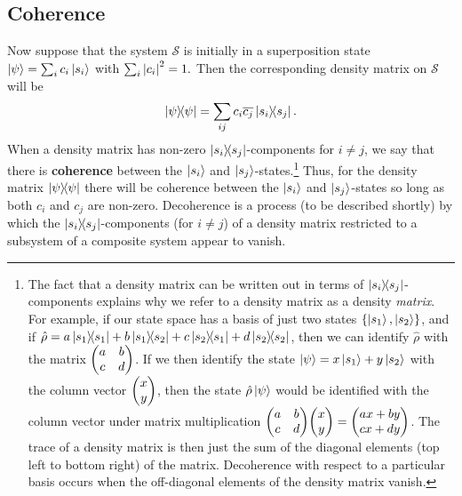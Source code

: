     \subsection{Coherence}
    Now suppose that the system $\mathcal{S}$ is initially in a superposition state $\ket{\psi}=\sum_i c_i\ket{s_i}$ with $\sum_i\abs{c_i}^2=1.$ Then the corresponding density matrix on $\mathcal{S}$ will be $$\dyad{\psi}=\sum_{ij} c_i\overline{c_j}\dyad{s_i}{s_j}.$$ When a density matrix has non-zero $\dyad{s_i}{s_j}$-components for $i\neq j$, we say that there is \textbf{coherence} between the  $\ket{s_i}$ and $\ket{s_j}$-states.\footnote{The fact that a density matrix can be written out in terms of $\dyad{s_i}{s_j}$-components explains why we refer to a density matrix as a density \emph{matrix}. For example, if our state space has a basis of just two states $\{\ket{s_1},\ket{s_2}\}$, and if $\hat{\rho}=a\dyad{s_1}+b\dyad{s_1}{s_2}+c\dyad{s_2}{s_1}+d\dyad{s_2}$, then we can identify $\hat{\rho}$ with the matrix $\mqty(a & b \\ c & d)$. If we then identify the state $\ket{\psi}=x\ket{s_1}+y\ket{s_2}$ with the column vector $\mqty(x \\ y)$, then the state $\hat{\rho}\ket{\psi}$ would be identified with the column vector under matrix multiplication $\mqty(a & b \\ c & d) \mqty(x \\ y)=\mqty(ax+by \\ cx+dy)$. The trace of a density matrix is then just the sum of the diagonal elements (top left to bottom right) of the matrix. Decoherence with respect to a particular basis occurs when the off-diagonal elements of the density matrix vanish. } Thus, for the density matrix $\dyad{\psi}$ there will be coherence between the $\ket{s_i}$ and $\ket{s_j}$-states so long as both $c_i$ and $c_j$ are non-zero. Decoherence is a process (to be described shortly) by which the $\dyad{s_i}{s_j}$-components (for $i\neq j$) of a density matrix restricted to a subsystem of a composite system appear to vanish.  
